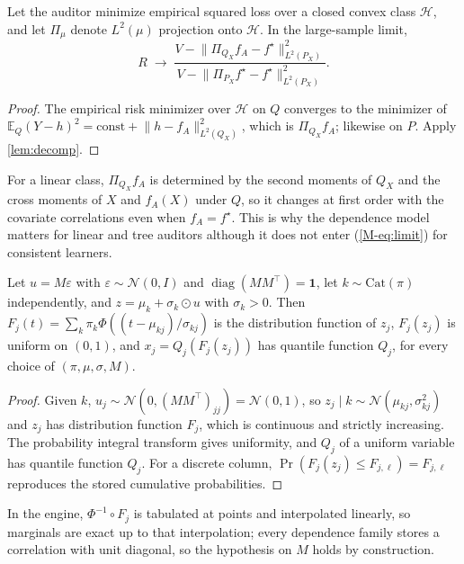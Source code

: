 \documentclass[10pt,letterpaper]{article}
\begin{document}
\begin{proposition}
\label{prop:misspec}
Let the auditor minimize empirical squared loss over a closed convex class $\mathcal{H}$, and let
$\Pi_\mu$ denote $L^2(\mu)$ projection onto $\mathcal{H}$. In the large-sample limit,
\[
R\;\to\;\frac{V-\lVert\Pi_{Q_X}f_A-f^\star\rVert^2_{L^2(P_X)}}{V-\lVert\Pi_{P_X}f^\star-f^\star\rVert^2_{L^2(P_X)}} .
\]
\end{proposition}

\begin{proof}
The empirical risk minimizer over $\mathcal{H}$ on $Q$ converges to the minimizer of
$\mathbb{E}_Q(Y-h)^2=\mathrm{const}+\lVert h-f_A\rVert^2_{L^2(Q_X)}$, which is $\Pi_{Q_X}f_A$; likewise on $P$. Apply
\cref{lem:decomp}.
\end{proof}

For a linear class, $\Pi_{Q_X}f_A$ is determined by the second moments of $Q_X$ and the cross moments of
$X$ and $f_A(X)$ under $Q$, so it changes at first order with the covariate correlations even when
$f_A=f^\star$. This is why the dependence model matters for linear and tree auditors although it does not
enter (\ref{M-eq:limit}) for consistent learners.

\begin{lemma}
\label{lem:marginals}
Let $u=M\varepsilon$ with $\varepsilon\sim\mathcal{N}(0,I)$ and $\operatorname{diag}(MM^\top)=\mathbf{1}$, let
$k\sim\mathrm{Cat}(\pi)$ independently, and $z=\mu_k+\sigma_k\odot u$ with $\sigma_k>0$. Then
$F_j(t)=\sum_k\pi_k\Phi((t-\mu_{kj})/\sigma_{kj})$ is the distribution function of $z_j$, $F_j(z_j)$ is
uniform on $(0,1)$, and $x_j=Q_j(F_j(z_j))$ has quantile function $Q_j$, for every choice of
$(\pi,\mu,\sigma,M)$.
\end{lemma}

\begin{proof}
Given $k$, $u_j\sim\mathcal{N}(0,(MM^\top)_{jj})=\mathcal{N}(0,1)$, so $z_j\mid k\sim\mathcal{N}(\mu_{kj},\sigma_{kj}^2)$ and
$z_j$ has distribution function $F_j$, which is continuous and strictly increasing. The probability
integral transform gives uniformity, and $Q_j$ of a uniform variable has quantile function $Q_j$. For a
discrete column, $\Pr(F_j(z_j)\le F_{j,\ell})=F_{j,\ell}$ reproduces the stored cumulative probabilities.
\end{proof}

In the engine, $\Phi^{-1}\circ F_j$ is tabulated at \CfgScoreTable{} points and interpolated linearly, so
marginals are exact up to that interpolation; every dependence family stores a correlation with unit
diagonal, so the hypothesis on $M$ holds by construction.
\end{document}
